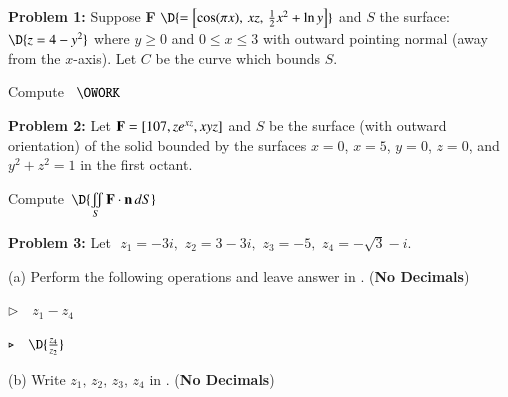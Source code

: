 \documentclass[11pt]{article}
\begin{document}
\vspace{1.0cm}

\thispagestyle{empty} 
\newpage
\thispagestyle{empty}

{\bf Problem 1:} Suppose {\bf F} $\D{= \left[\cos(\pi x),\, xz,\, \frac{1}{2}x^2+\ln y\right]}$ and $S$ the surface: $\D{z = 4-y^2}$ where $y \ge 0$ and $0\le x \le 3$ with outward pointing normal (away from the $x$-axis).  Let $C$ be the curve which bounds $S$.  

\vspace{0.2cm}

Compute \, $\OWORK$

\thispagestyle{empty}
\newpage
\thispagestyle{empty}

{\bf Problem 2:} Let $\text{\bf F} = [107,ze^{xz},xyz]$ and $S$ be the surface (with outward orientation) of the solid bounded by the surfaces $x = 0$, $x = 5$, $y = 0$, $z = 0$, and $y^2 + z^2 = 1$ in the first octant.

\vspace{0.2cm}

Compute \,$\D{\iint \limits_{S} \text{\bf F}\cdot \text{\bf n} \, dS}$

\thispagestyle{empty}
\newpage
\thispagestyle{empty}

%

{\bf Problem 3:} Let \,\,$z_1 = -3i,\,\, z_2 = 3-3i,\,\, z_3 = -5,\,\, z_4 = -\sqrt{3}-i$.

(a) Perform the following operations and leave answer in . ({\bf No Decimals})

\vspace{0.3cm}

\qquad $\triangleright \quad z_1 - z_4$

\vspace{1.0cm}

\qquad $\triangleright \quad \D{\frac{z_4}{z_2}}$

\vspace{1.0cm}

(b) Write $z_1, \, z_2, \, z_3, \, z_4$ in . ({\bf No Decimals})
\end{document}
